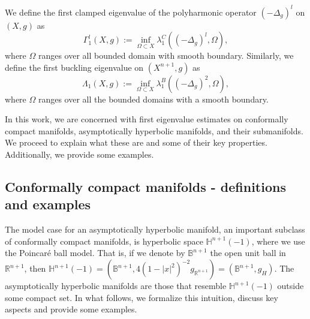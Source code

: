 \documentclass{amsart}
\begin{document}
\begin{definition}
We define the first clamped eigenvalue of the polyharmonic operator $(-\Delta_g)^l$ on $(X,g)$ as 
\begin{equation}\label{Poly-Eigenvalue-Def}
    \Gamma^l_1(X,g):= \inf_{\Omega\subset X}\lambda_1^C((-\Delta_{g})^l, \Omega),
\end{equation}
where $\Omega$ ranges over all bounded domain with smooth boundary. Similarly, we define the first buckling eigenvalue on $(X^{n+1},g)$ as 
\begin{equation}
    \Lambda_1(X,g):=\inf_{\Omega\subset X} \lambda_1^B((-\Delta_{g})^2,\Omega),
\end{equation}
where $\Omega$ ranges over all the bounded domains with a smooth boundary.
\end{definition}

In this work, we are concerned with first eigenvalue estimates on conformally compact manifolds, asymptotically hyperbolic manifolds, and their submanifolds. We proceed to explain what these are and some of their key properties. Additionally, we provide some examples. 

\subsection{Conformally compact manifolds - definitions and examples}

The model case for an asymptotically hyperbolic manifold, an important subclass of conformally compact manifolds, is hyperbolic space $\mathbb{H}^{n+1}(-1)$, where we use the Poincar\'e ball model. That is, if we denote by $\mathbb{B}^{n+1}$ the open unit ball in $\mathbb{R}^{n+1}$, then $\mathbb{H}^{n+1}(-1) = (\mathbb{B}^{n+1}, 4(1-|x|^2)^{-2}g_{\mathbb{R}^{n+1}}) = (\mathbb{B}^{n+1}, g_H)$. The asymptotically hyperbolic manifolds are those that resemble $\mathbb{H}^{n+1}(-1)$ outside some compact set. In what follows, we formalize this intuition, discuss key aspects and provide some examples. 
\end{document}
